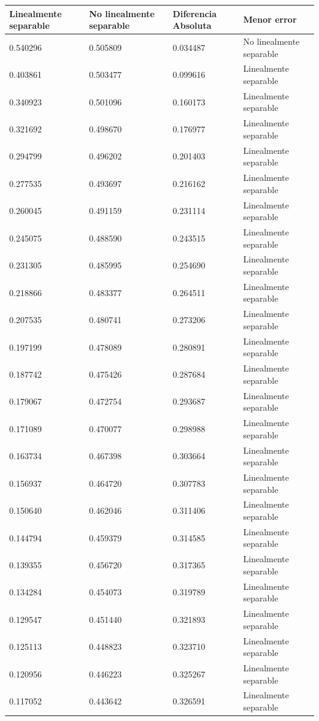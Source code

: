 \begin{tabular}{llll}
\toprule
Linealmente separable & No linealmente separable & Diferencia Absoluta & Menor error \\
\midrule
0.540296 & 0.505809 & 0.034487 & No linealmente separable \\
0.403861 & 0.503477 & 0.099616 & Linealmente separable \\
0.340923 & 0.501096 & 0.160173 & Linealmente separable \\
0.321692 & 0.498670 & 0.176977 & Linealmente separable \\
0.294799 & 0.496202 & 0.201403 & Linealmente separable \\
0.277535 & 0.493697 & 0.216162 & Linealmente separable \\
0.260045 & 0.491159 & 0.231114 & Linealmente separable \\
0.245075 & 0.488590 & 0.243515 & Linealmente separable \\
0.231305 & 0.485995 & 0.254690 & Linealmente separable \\
0.218866 & 0.483377 & 0.264511 & Linealmente separable \\
0.207535 & 0.480741 & 0.273206 & Linealmente separable \\
0.197199 & 0.478089 & 0.280891 & Linealmente separable \\
0.187742 & 0.475426 & 0.287684 & Linealmente separable \\
0.179067 & 0.472754 & 0.293687 & Linealmente separable \\
0.171089 & 0.470077 & 0.298988 & Linealmente separable \\
0.163734 & 0.467398 & 0.303664 & Linealmente separable \\
0.156937 & 0.464720 & 0.307783 & Linealmente separable \\
0.150640 & 0.462046 & 0.311406 & Linealmente separable \\
0.144794 & 0.459379 & 0.314585 & Linealmente separable \\
0.139355 & 0.456720 & 0.317365 & Linealmente separable \\
0.134284 & 0.454073 & 0.319789 & Linealmente separable \\
0.129547 & 0.451440 & 0.321893 & Linealmente separable \\
0.125113 & 0.448823 & 0.323710 & Linealmente separable \\
0.120956 & 0.446223 & 0.325267 & Linealmente separable \\
0.117052 & 0.443642 & 0.326591 & Linealmente separable \\

\end{tabular}
